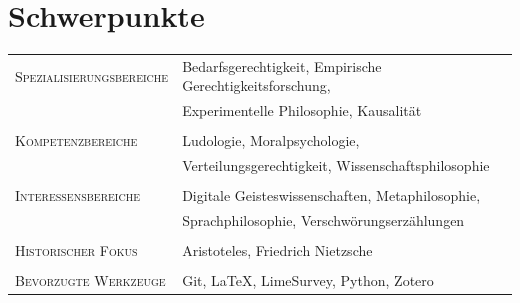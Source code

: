 \documentclass[a4paper,10pt]{article}
\begin{document}
\section{Schwerpunkte}
\begin{longtable}{p{4cm}p{11.5cm}}
   \textsc{Spezialisierungsbereiche}   & Bedarfsgerechtigkeit, Empirische Gerechtigkeitsforschung,   \\
                                       & Experimentelle Philosophie, Kausalität                      \\
                                       &                                                             \\
   \textsc{Kompetenzbereiche}          & Ludologie, Moralpsychologie,                                \\
                                       & Verteilungsgerechtigkeit, Wissenschaftsphilosophie          \\
                                       &                                                             \\
   \textsc{Interessensbereiche}        & Digitale Geisteswissenschaften, Metaphilosophie,            \\
                                       & Sprachphilosophie, Verschwörungserzählungen                 \\
                                       &                                                             \\
   \textsc{Historischer Fokus}         & Aristoteles, Friedrich Nietzsche                            \\
                                       &                                                             \\
   \textsc{Bevorzugte Werkzeuge}       & Git, \LaTeX, LimeSurvey, Python, Zotero                     \\
\end{longtable}


\clearpage
\end{document}
